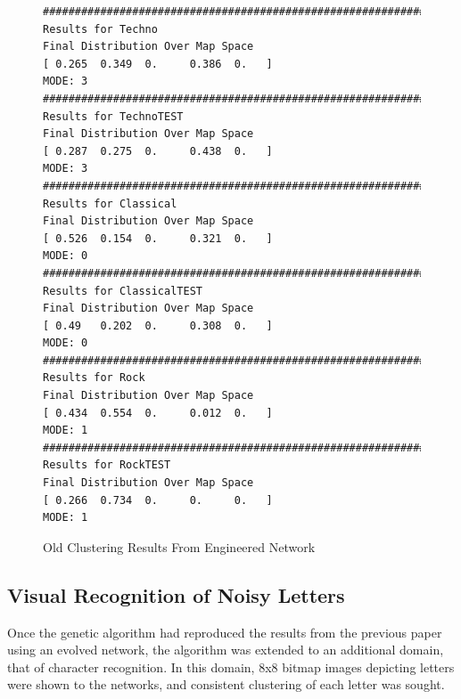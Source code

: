 \documentclass[12pt,a4paper]{article}
\begin{document}
\begin{figure}[H]
\caption{Old Clustering Results From Engineered Network}
\begin{lstlisting}
################################################################################
Results for Techno
Final Distribution Over Map Space
[ 0.265  0.349  0.     0.386  0.   ]
MODE: 3
################################################################################
Results for TechnoTEST
Final Distribution Over Map Space
[ 0.287  0.275  0.     0.438  0.   ]
MODE: 3
################################################################################
Results for Classical
Final Distribution Over Map Space
[ 0.526  0.154  0.     0.321  0.   ]
MODE: 0
################################################################################
Results for ClassicalTEST
Final Distribution Over Map Space
[ 0.49   0.202  0.     0.308  0.   ]
MODE: 0
################################################################################
Results for Rock
Final Distribution Over Map Space
[ 0.434  0.554  0.     0.012  0.   ]
MODE: 1
################################################################################
Results for RockTEST
Final Distribution Over Map Space
[ 0.266  0.734  0.     0.     0.   ]
MODE: 1
\end{lstlisting}
\label{fig:audtop2}
\end{figure}

\subsection{Visual Recognition of Noisy Letters}
Once the genetic algorithm had reproduced the results from the previous paper using an evolved network, the algorithm was extended to an additional domain, that of character recognition.  In this domain, 8x8 bitmap images depicting letters were shown to the networks, and consistent clustering of each letter was sought.
\end{document}
